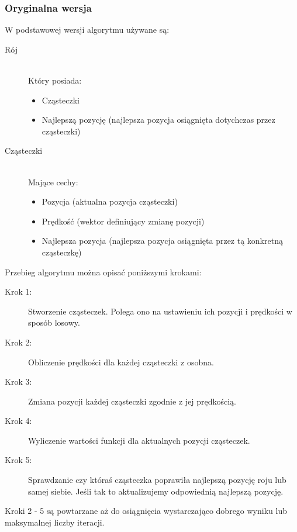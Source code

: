 \subsubsection{Oryginalna wersja}
\par W podstawowej wersji algorytmu używane są:
\begin{description}
  \item[Rój] \hfill \\
      Który posiada:
    \begin{itemize}
      \item Cząsteczki 
      \item Najlepszą pozycję (najlepsza pozycja osiągnięta dotychczas przez cząsteczki)
    \end{itemize}
  \item[Cząsteczki] \hfill \\
      Mające cechy:
    \begin{itemize}
      \item Pozycja (aktualna pozycja cząsteczki)
      \item Prędkość (wektor definiujący zmianę pozycji)
      \item Najlepsza pozycja (najlepsza pozycja osiągnięta przez tą konkretną cząsteczkę)
    \end{itemize}
\end{description}
\par Przebieg algorytmu można opisać poniższymi krokami:
\begin{description}
  \item[Krok 1:] 
     \par Stworzenie cząsteczek. Polega ono na ustawieniu ich pozycji i prędkości w sposób losowy. 
  \item[Krok 2:]
    \par Obliczenie prędkości dla każdej cząsteczki z osobna. 
  \item[Krok 3:]
        \par Zmiana pozycji każdej cząsteczki zgodnie z jej prędkością.
  \item[Krok 4:]
        \par Wyliczenie wartości funkcji dla aktualnych pozycji cząsteczek.
  \item[Krok 5:] 
      \par Sprawdzanie czy któraś cząsteczka poprawiła najlepszą pozycję roju lub samej siebie. Jeśli tak to aktualizujemy odpowiednią najlepszą pozycję.

\end{description}
    \par Kroki 2 - 5 są powtarzane aż do osiągnięcia wystarczająco dobrego wyniku lub maksymalnej liczby iteracji.
